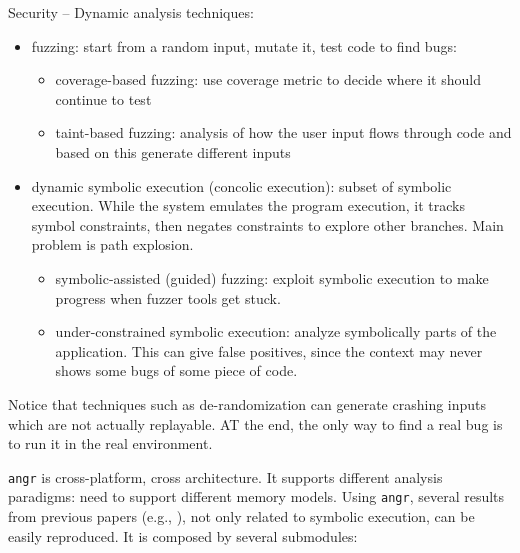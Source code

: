 Security -- Dynamic analysis techniques:
\begin{itemize}
  \item fuzzing: start from a random input, mutate it, test code to find bugs:
    \begin{itemize}
      \item coverage-based fuzzing: use coverage metric to decide where it should continue to test
      \item taint-based fuzzing: analysis of how the user input flows through code and based on this generate different inputs
    \end{itemize}
  \item dynamic symbolic execution (concolic execution): subset of symbolic execution. While the system emulates the program execution, it tracks symbol constraints, then negates constraints to explore other branches. Main problem is path explosion.
    \begin{itemize}
      \item symbolic-assisted (guided) fuzzing: exploit symbolic execution to make progress when fuzzer tools get stuck.
      \item under-constrained symbolic execution: analyze symbolically parts of the application. This can give false positives, since the context may never shows some bugs of some piece of code.
    \end{itemize}
\end{itemize}

Notice that techniques such as de-randomization can generate crashing inputs which are not actually replayable. AT the end, the only way to find a real bug is to run it in the real environment.

{\tt angr} is cross-platform, cross architecture. It supports different analysis paradigms: need to support different memory models. Using {\tt angr}, several results from previous papers (e.g., \cite{AEG-NDSS11}), not only related to symbolic execution,  can be easily reproduced. It is composed by several submodules:

